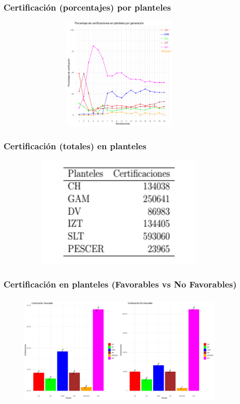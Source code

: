 \documentclass[xcolor=dvipsnames]{beamer}
\begin{document}
\begin{frame}\frametitle{Certificaci\'on (porcentajes) por planteles}
\begin{figure}[H]
\centering
\includegraphics[width=10cm,height=5.5cm]{Imagenes/graficoPorcentajesPlantel.pdf}
\end{figure}
\end{frame}

\begin{frame}\frametitle{Certificaci\'on (totales) en planteles}
\begin{figure}[H]
\centering
\includegraphics[width=10cm,height=5.5cm]{Tablas/CertificacionPlanteles.png}
\end{figure}
\end{frame}

\begin{frame}\frametitle{Certificaci\'on en planteles (Favorables vs No Favorables)}
\begin{figure}[H]
\centering
\includegraphics[width=10cm,height=5.5cm]{Imagenes/graficoCertificacionPlantelesFnF.pdf}
\end{figure}
\end{frame}
\end{document}
